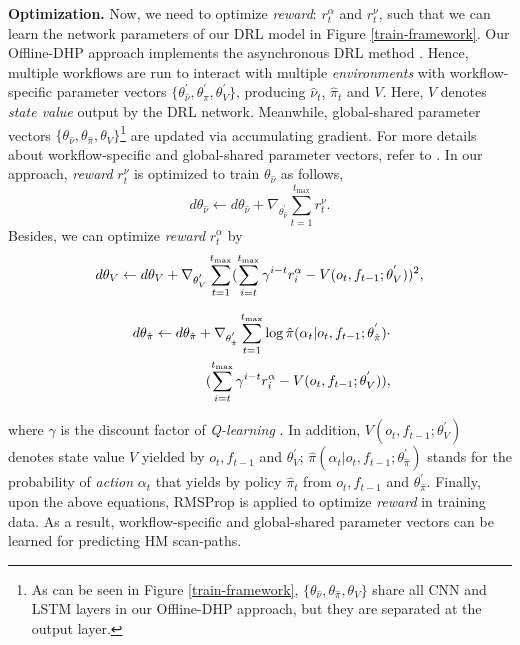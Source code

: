 \documentclass[10pt,journal,compsoc]{IEEEtran}
\begin{document}
\textbf{Optimization.}
Now, we need to optimize \textit{reward}: $r^{\alpha}_t$ and $r^{\nu}_t$, such that we can learn the network parameters of our DRL model in Figure \ref{train-framework}.
Our Offline-DHP approach implements the asynchronous DRL method \cite{mnih2016asynchronous}.
Hence, multiple workflows are run to interact with multiple \textit{environments} with workflow-specific parameter vectors $\{ \theta^{'}_{\hat{\nu}}, \theta^{'}_{\hat{\pi}}, \theta^{'}_{V} \}$, producing $\hat{\nu}_t$, $\hat{\pi}_t$ and $V$.
Here, $V$ denotes \textit{state value} output by the DRL network.
Meanwhile, global-shared parameter vectors $\{ \theta_{\hat{\nu}}, \theta_{\hat{\pi}}, \theta_{V} \}$\footnote{As can be seen in Figure \ref{train-framework}, $\{ \theta_{\hat{\nu}}, \theta_{\hat{\pi}}, \theta_{V} \}$ share all CNN and LSTM layers in our Offline-DHP approach, but they are separated at the output layer.} are updated via accumulating gradient.
For more details about workflow-specific and global-shared parameter vectors, refer to \cite{mnih2016asynchronous}.
In our approach, \textit{reward} $r^{\nu}_t$ is optimized to train $\theta_{\hat{\nu}}$ as follows,
\begin{equation}
\label{lemma-1}
d \theta_{\hat{\nu}} \leftarrow d \theta_{\hat{\nu}} + \nabla_{\theta_{\hat{\nu}}^{'}} \sum_{t=1}^{t_{\text{max}}} r^{\nu}_t.
\end{equation}
Besides, we can optimize \textit{reward} $r^{\alpha}_t$ by
\begin{equation}
\label{opt-2}
\small d \theta_{V} \leftarrow d \theta_{V} + \nabla_{\theta_{V}^{'}} \sum_{t = 1}^{t_{\text{max}}} (\sum_{i=t}^{t_{\text{max}}} \gamma^{i-t} r^{\alpha}_{i} - V(o_{t}, f_{t-1} ; \theta_{V}^{'}))^2,
\end{equation}
\begin{small}
\begin{eqnarray}
\label{opt-3}
\hspace{0.1cm} \nonumber d \theta_{\hat{\pi}} \leftarrow d \theta_{\hat{\pi}} +\nabla_{\theta_{\hat{\pi}}^{'}} \sum_{t = 1}^{t_{\text{max}}} \log \hat{\pi}( \alpha_{t} | o_{t}, f_{t-1} ; \theta_{\hat{\pi}}^{'})\cdot \\
(\sum_{i = t}^{t_{\text{max}}} \gamma^{i-t} r^{\alpha}_{i} - V(o_{t}, f_{t-1} ; \theta_{V}^{'})),
\end{eqnarray}
\end{small}
where $\gamma$ is the discount factor of \textit{Q-learning} \cite{watkins1992q}.
In addition, $V(o_{t}, f_{t-1} ; \theta_{V}^{'})$ denotes state value $V$ yielded by $o_{t}, f_{t-1}$ and $\theta_{V}^{'}$; $\hat{\pi}( \alpha_{t} | o_{t}, f_{t-1} ; \theta_{\hat{\pi}}^{'})$ stands for the probability of \textit{action} $\alpha_{t}$ that yields by policy $\hat{\pi}_t$ from $o_{t}, f_{t-1}$ and $\theta_{\hat{\pi}}^{'}$.
Finally, upon the above equations, RMSProp \cite{tieleman2012lecture} is applied to optimize \textit{reward} in training data. As a result, workflow-specific and global-shared parameter vectors can be learned for predicting HM scan-paths.
\end{document}
